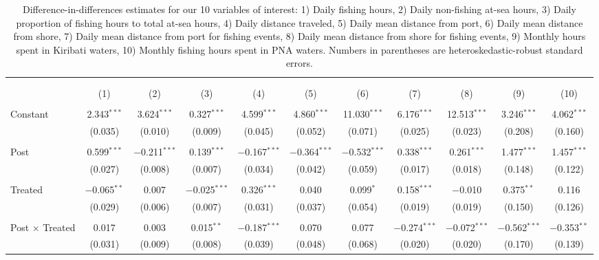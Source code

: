 
\begin{table}[H] \centering 
  \caption{\label{tab:main_DID}Difference-in-differences estimates for our 10 variables of interest: 1) Daily fishing hours, 2) Daily non-fishing at-sea hours, 3) Daily proportion of fishing hours to total at-sea hours, 4) Daily distance traveled, 5) Daily mean distance from port, 6) Daily mean distance from shore, 7) Daily mean distance from port for fishing events, 8) Daily mean distance from shore for fishing events, 9) Monthly hours spent in Kiribati waters, 10) Monthly fishing hours spent in PNA waters. Numbers in parentheses are heteroskedastic-robust standard errors.} 
  \label{} 
\footnotesize 
\begin{tabular}{@{\extracolsep{1pt}}lcccccccccc} 
\\[-1.8ex]\hline 
\hline \\[-1.8ex] 
\\[-1.8ex] & (1) & (2) & (3) & (4) & (5) & (6) & (7) & (8) & (9) & (10)\\ 
\hline \\[-1.8ex] 
 Constant & 2.343$^{***}$ & 3.624$^{***}$ & 0.327$^{***}$ & 4.599$^{***}$ & 4.860$^{***}$ & 11.030$^{***}$ & 6.176$^{***}$ & 12.513$^{***}$ & 3.246$^{***}$ & 4.062$^{***}$ \\ 
  & (0.035) & (0.010) & (0.009) & (0.045) & (0.052) & (0.071) & (0.025) & (0.023) & (0.208) & (0.160) \\ 
  & & & & & & & & & & \\ 
 Post & 0.599$^{***}$ & $-$0.211$^{***}$ & 0.139$^{***}$ & $-$0.167$^{***}$ & $-$0.364$^{***}$ & $-$0.532$^{***}$ & 0.338$^{***}$ & 0.261$^{***}$ & 1.477$^{***}$ & 1.457$^{***}$ \\ 
  & (0.027) & (0.008) & (0.007) & (0.034) & (0.042) & (0.059) & (0.017) & (0.018) & (0.148) & (0.122) \\ 
  & & & & & & & & & & \\ 
 Treated & $-$0.065$^{**}$ & 0.007 & $-$0.025$^{***}$ & 0.326$^{***}$ & 0.040 & 0.099$^{*}$ & 0.158$^{***}$ & $-$0.010 & 0.375$^{**}$ & 0.116 \\ 
  & (0.029) & (0.006) & (0.007) & (0.031) & (0.037) & (0.054) & (0.019) & (0.019) & (0.150) & (0.126) \\ 
  & & & & & & & & & & \\ 
 Post $\times$ Treated & 0.017 & 0.003 & 0.015$^{**}$ & $-$0.187$^{***}$ & 0.070 & 0.077 & $-$0.274$^{***}$ & $-$0.072$^{***}$ & $-$0.562$^{***}$ & $-$0.353$^{**}$ \\ 
  & (0.031) & (0.009) & (0.008) & (0.039) & (0.048) & (0.068) & (0.020) & (0.020) & (0.170) & (0.139) \\ 

\end{tabular}
\end{table}
